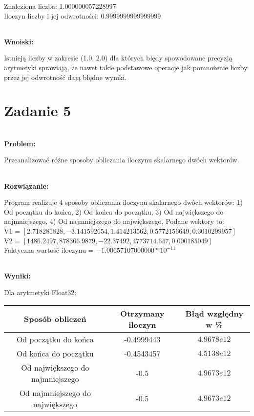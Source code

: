 \documentclass[a4paper,12pt]{article}
\begin{document}
Znaleziona liczba: 1.000000057228997 \\
Iloczyn liczby i jej odwrotności: 0.9999999999999999

\textbf{\\Wnoiski:}

Istnieją liczby w zakresie (1.0, 2.0) dla których błędy spowodowane precyzją arytmetyki sprawiają, że nawet takie podstawowe operacje jak pomnożenie liczby przez jej odwrotność dają błędne wyniki.

\section{Zadanie 5}

\textbf{\\Problem:}

Przeanalizować różne sposoby obliczania iloczynu skalarnego dwóch wektorów.

\textbf{\\Rozwiązanie:}

Program realizuje 4 sposoby obliczania iloczynu skalarnego dwóch wektorów:
 1) Od początku do końca,
 2) Od końca do początku,
 3) Od największego do najmniejszego,
 4) Od najmniejszego do największego,
Podane wektory to:
\\V1 = \([2.718281828, -3.141592654, 1.414213562, 0.5772156649, 0.3010299957]\)
\\V2 =  \([1486.2497, 878366.9879, -22.37492, 4773714.647, 0.000185049]\)
\\Faktyczna wartość iloczynu = \(-1.00657107000000*10^{-11}\)

\textbf{\\Wyniki:}

Dla arytmetyki Float32:

\begin{center}
\begin{tabular}{ |c|c|c| }
\hline
Sposób obliczeń & Otrzymany iloczyn & Błąd względny w \% \\
\hline
Od początku do końca & \small{-0.4999443} & \small{\(4.9678e12\)} \\
Od końca do początku & \small{-0.4543457} & \small{\(4.5138e12\)} \\
Od największego do najmniejszego & \small{-0.5} & \small{\(4.9673e12\)} \\
Od najmniejszego do największego & \small{-0.5} & \small{\(4.9673e12\)} \\
\hline
\end{tabular}
\end{center}
\end{document}
